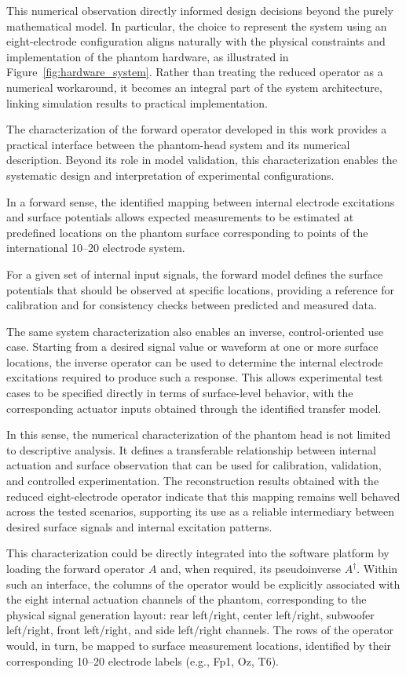 \documentclass[../00_Main.tex]{subfiles}
\begin{document}
This numerical observation directly informed design decisions beyond the purely mathematical model. In particular, the choice to represent the system using an eight-electrode configuration aligns naturally with the physical constraints and implementation of the phantom hardware, as illustrated in Figure~\ref{fig:hardware_system}. Rather than treating the reduced operator as a numerical workaround, it becomes an integral part of the system architecture, linking simulation results to practical implementation.

The characterization of the forward operator developed in this work provides a practical
interface between the phantom-head system and its numerical description.
Beyond its role in model validation, this characterization enables the systematic design
and interpretation of experimental configurations.

In a forward sense, the identified mapping between internal electrode excitations and
surface potentials allows expected measurements to be estimated at predefined locations on
the phantom surface corresponding to points of the international 10--20 electrode system.

For a given set of internal input signals, the forward model defines the surface potentials
that should be observed at specific locations, providing a reference for calibration and
for consistency checks between predicted and measured data.

The same system characterization also enables an inverse, control-oriented use case.
Starting from a desired signal value or waveform at one or more surface locations, the
inverse operator can be used to determine the internal electrode excitations required to
produce such a response.
This allows experimental test cases to be specified directly in terms of surface-level
behavior, with the corresponding actuator inputs obtained through the identified transfer
model.

In this sense, the numerical characterization of the phantom head is not limited to
descriptive analysis.
It defines a transferable relationship between internal actuation and surface observation
that can be used for calibration, validation, and controlled experimentation.
The reconstruction results obtained with the reduced eight-electrode operator indicate
that this mapping remains well behaved across the tested scenarios, supporting its use as a
reliable intermediary between desired surface signals and internal excitation patterns.

This characterization could be directly integrated into the software platform by loading
the forward operator \(A\) and, when required, its pseudoinverse \(A^{\dagger}\).
Within such an interface, the columns of the operator would be explicitly associated with
the eight internal actuation channels of the phantom, corresponding to the physical signal
generation layout: rear left/right, center left/right, subwoofer left/right, front left/right,
and side left/right channels.
The rows of the operator would, in turn, be mapped to surface measurement locations,
identified by their corresponding 10--20 electrode labels (e.g., Fp1, Oz, T6).
\end{document}
